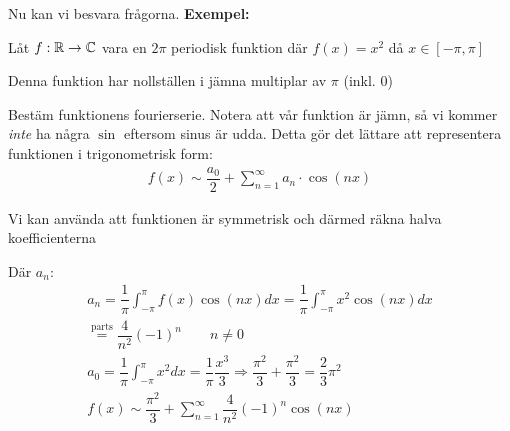 \par\bigskip
\noindent Nu kan vi besvara frågorna.
\newpage
\noindent\textbf{Exempel:}\par
\noindent Låt $f:\mathbb{R}\to\mathbb{C}$ vara en $2\pi$ periodisk funktion där $f(x) = x^2$ då $x\in[-\pi,\pi]$
\par\bigskip
\noindent Denna funktion har nollställen i jämna multiplar av $\pi$ (inkl. 0)
\par\bigskip
\noindent Bestäm funktionens fourierserie. Notera att vår funktion är jämn, så vi kommer \textit{inte} ha några $\sin$ eftersom sinus är udda. Detta gör det lättare att representera funktionen i trigonometrisk form:
\begin{equation*}
  \begin{gathered}
    f(x)\sim \dfrac{a_0}{2}+\sum_{n=1}^{\infty}a_n\cdot\cos(nx)
  \end{gathered}
\end{equation*}\par
\noindent Vi kan använda att funktionen är symmetrisk och därmed räkna halva koefficienterna\par 
\noindent Där $a_n$:
\begin{equation*}
  \begin{gathered}
    a_n= \dfrac{1}{\pi}\int_{-\pi}^{\pi}f(x)\cos(nx)dx = \dfrac{1}{\pi}\int_{-\pi}^{\pi}x^2\cos(nx)dx\\
    \stackrel{\text{parts}}{=} \dfrac{4}{n^2}(-1)^n\qquad n\neq0\\
    a_0 = \dfrac{1}{\pi}\int_{-\pi}^{\pi}x^2dx = \dfrac{1}{\pi}\dfrac{x^3}{3}\Rightarrow \dfrac{\pi^2}{3}+\dfrac{\pi^2}{3} = \dfrac{2}{3}\pi^2\\
    f(x)\sim \dfrac{\pi^2}{3}+\sum_{n=1}^{\infty}\dfrac{4}{n^2}(-1)^n\cos(nx)
  \end{gathered}
\end{equation*}
